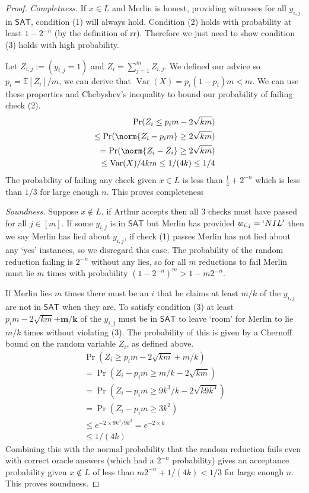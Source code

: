 \documentclass{article}
\begin{document}
\begin{proof}
    \textit{Completness.} If $x\in L$ and Merlin is honest, providing witnesses for all $y_{i,j}$ in $\mathsf{SAT}$, condition (1) will always hold. Condition (2) holds with probability at least $1-2^{-n}$ (by the definition of rr). Therefore we just need to show condition (3) holds with high probability.

    Let $Z_{i,j}:=(y_{i,j}=1)$ and $Z_{i}=\sum_{j=1}^m Z_{i,j}$. We defined our advice so $p_i= \mathbb{E}[Z_i]/m$, we can derive that $\operatorname{Var}(X)=p_i(1-p_i)m<m$. We can use these properties and Chebyshev's inequality to bound our probability of failing check (2).
    \begin{align*}
        \Pr(Z_i\leq p_im-2\sqrt{km})\\
        \leq\Pr(\norm{Z_i-p_im}\geq 2\sqrt{km})\\
        =\Pr(\norm{Z_i-\Bar{Z_i}}\geq 2\sqrt{km})\\
        \leq \operatorname{Var}(X)/4km\leq 1/(4k)\leq1/4
    \end{align*}
    The probability of failing any check given $x\in L$ is less than $\frac{1}{4}+2^{-n}$ which is less than $1/3$ for large enough $n$. This proves completeness

    \textit{Soundness.} Suppose $x \notin L$, if Arthur accepts then all 3 checks must have passed for all $j\in[m]$. If some $y_{i,j}$ is in $\mathsf{SAT}$ but Merlin has provided $w_{i,j}=`NIL'$ then we say Merlin has lied about $y_{i,j}$, if check (1) passes Merlin has not lied about any `yes' instances, so we disregard this case.
    The probability of the random reduction failing is $2^{-n}$ without any lies, so for all $m$ reductions to fail Merlin must lie $m$ times with probability $(1-2^{-n})^m> 1-m2^{-n}$.

    If Merlin lies $m$ times there must be an $i$ that he claims at least $m/k$ of the $y_{i,j}$ are not in $\mathsf{SAT}$ when they are. To satisfy condition (3) at least $p_im-2\sqrt{km}\mathbf{+m/k}$ of the $y_{i,j}$ must be in $\mathsf{SAT}$ to leave `room' for Merlin to lie $m/k$ times without violating (3). The probability of this is given by a Chernoff bound on the random variable $Z_i$, as defined above.
    \begin{align*}
    \Pr\left(Z_i\geq p_im-2\sqrt{km}+m/k\right)\\
    =\Pr\left(Z_i-p_im\geq m/k-2\sqrt{km}\right)\\
    =\Pr\left(Z_i-p_im\geq 9k^3/k-2\sqrt{k9k^3}\right)\\
    =\Pr\left(Z_i-p_im\geq 3k^2\right)\\
    \leq e^{-2\times 9k^4/9k^3}=e^{-2\times k}\\
    \leq 1/(4k)
    \end{align*}
    Combining this with the normal probability that the random reduction fails even with correct oracle answers (which had a $2^{-n}$ probability) gives an acceptance probability given $x\notin L$ of less than $m2^{-n}+1/(4k)<1/3$ for large enough $n$. This proves soundness.
    

\end{proof}
\end{document}
